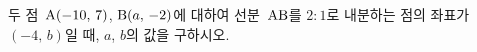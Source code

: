 두 점~$\mathrm{A}(-10,\,7)$, $\mathrm{B}(a,\,-2)$에 대하여 선분~$\mathrm{AB}$를 $2:1$로 내분하는 점의 좌표가 $(-4,\,b)$일 때, $a$, $b$의 값을 구하시오.
